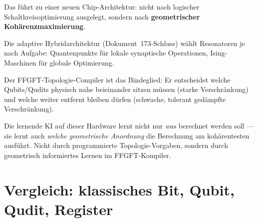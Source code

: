 Das führt zu einer neuen Chip-Architektur:
nicht nach logischer Schaltkreisoptimierung ausgelegt,
sondern nach \textbf{geometrischer Kohärenzmaximierung}.

\begin{significance}
Die adaptive Hybridarchitektur (Dokument~173-Schluss)
wählt Resonatoren je nach Aufgabe:
Quantenpunkte für lokale synaptische Operationen,
Ising-Maschinen für globale Optimierung.

Der FFGFT-Topologie-Compiler ist das Bindeglied:
Er entscheidet welche Qubits/Qudits physisch
nahe beieinander sitzen müssen (starke Verschränkung)
und welche weiter entfernt bleiben dürfen
(schwache, tolerant gedämpfte Verschränkung).

Die lernende KI auf dieser Hardware lernt nicht nur
\emph{was} berechnet werden soll ---
sie lernt auch \emph{welche geometrische Anordnung}
die Berechnung am kohärentesten ausführt.
Nicht durch programmierte Topologie-Vorgaben,
sondern durch geometrisch informiertes Lernen
im FFGFT-Kompiler.
\end{significance}

\section{Vergleich: klassisches Bit, Qubit, Qudit, Register}
\label{sec:vergleich}

\begin{center}
\end{center}

